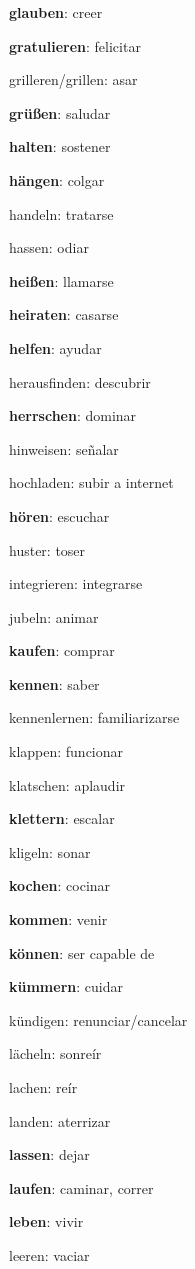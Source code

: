 \begin{multicols}{2}
\begin{myitemize}
\item \textbf{glauben}: creer
\item \textbf{gratulieren}: felicitar
\item grilleren/grillen: asar
\item \textbf{grüßen}: saludar
\item \textbf{halten}: sostener
\item \textbf{hängen}: colgar
\item handeln: tratarse
\item hassen: odiar
\item \textbf{heißen}: llamarse
\item \textbf{heiraten}: casarse
\item \textbf{helfen}: ayudar
\item herausfinden: descubrir
\item \textbf{herrschen}: dominar
\item hinweisen: señalar
\item hochladen: subir a internet
\item \textbf{hören}: escuchar
\item huster: toser
\item integrieren: integrarse
\item jubeln: animar
\item \textbf{kaufen}: comprar
\item \textbf{kennen}: saber
\item kennenlernen: familiarizarse
\item klappen: funcionar
\item klatschen: aplaudir
\item \textbf{klettern}: escalar
\item kligeln: sonar
\item \textbf{kochen}: cocinar
\item \textbf{kommen}: venir
\item \textbf{können}: ser capable de
\item \textbf{kümmern}: cuidar
\item kündigen: renunciar/cancelar
\item lächeln: sonreír
\item lachen: reír
\item landen: aterrizar
\item \textbf{lassen}: dejar
\item \textbf{laufen}: caminar, correr
\item \textbf{leben}: vivir
\item leeren: vaciar

\end{myitemize}
\end{multicols}
